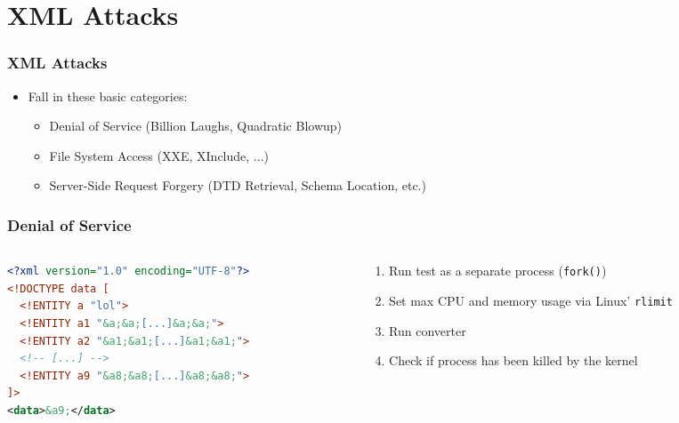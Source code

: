 \documentclass[
    alternativetitlepage=alternativ,
    cornerlogo=hgi_nds_logo2,
    sectionoverview,
]{rubpresentation}
\begin{document}
\section{XML Attacks}

\begin{frame}
    \frametitle{XML Attacks}
    \begin{itemize}
        \item{} Fall in these basic categories:
        \begin{itemize}
            \item{} Denial of Service (Billion Laughs, Quadratic Blowup)
            \item{} File System Access (XXE, XInclude, ...)
            \item{} Server-Side Request Forgery (DTD Retrieval, Schema Location, etc.)
        \end{itemize}
    \end{itemize}
\end{frame}

\begin{frame}[fragile]
    \frametitle{Denial of Service}
    \begin{columns}[t]
        \begin{column}{0.5\textwidth}
            \begin{lstlisting}[language=xml,basicstyle=\fontsize{8.5}{11}\ttfamily,numbers=none]
<?xml version="1.0" encoding="UTF-8"?>
<!DOCTYPE data [
  <!ENTITY a "lol">
  <!ENTITY a1 "&a;&a;[...]&a;&a;">
  <!ENTITY a2 "&a1;&a1;[...]&a1;&a1;">
  <!-- [...] -->
  <!ENTITY a9 "&a8;&a8;[...]&a8;&a8;">
]>
<data>&a9;</data>
            \end{lstlisting}
        \end{column}
        \begin{column}{0.5\textwidth}
            \begin{enumerate}
                \item{} Run test as a separate process (\texttt{fork()})
                \item{} Set max CPU and memory usage via Linux' \texttt{rlimit}
                \item{} Run converter
                \item{} Check if process has been killed by the kernel
            \end{enumerate}
        \end{column}
    \end{columns}
\end{frame}
\end{document}
